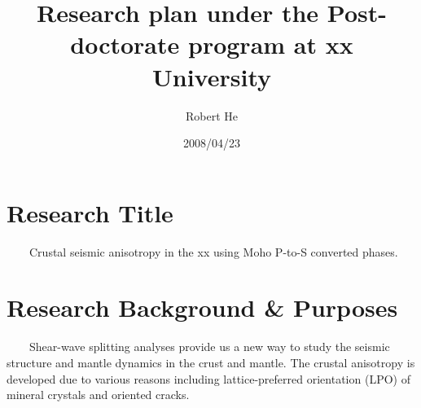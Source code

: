 \documentclass{article}
\begin{document}
\title{Research plan under the Post-doctorate program at xx University}
\author{Robert He}
\date{2008/04/23}
\maketitle
\newpage
\tableofcontents
\newpage

\section{Research Title}
~~~~Crustal seismic anisotropy in the xx using Moho P-to-S converted phases.


\section{Research Background \& Purposes}


~~~~Shear-wave splitting analyses provide us a new way to study the seismic structure and mantle dynamics in the crust and mantle. The crustal anisotropy is developed due to various reasons including lattice-preferred orientation (LPO) of mineral crystals and oriented cracks. 
\newline
\end{document}
